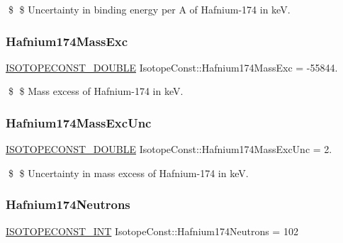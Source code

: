 \$ \$ Uncertainty in binding energy per A of Hafnium-\/174 in keV. \mbox{\label{group___isotope_const-_hafnium-_hf174_ga39241f3f01120e096b8ec5ea9c74ca69}} 
\subsubsection{\texorpdfstring{Hafnium174\+Mass\+Exc}{Hafnium174MassExc}}
{\footnotesize\ttfamily \mbox{\hyperlink{group___isotope_const-_macros_ga8f45a7272ce02c0b4c65c44636ed719a}{I\+S\+O\+T\+O\+P\+E\+C\+O\+N\+S\+T\+\_\+\+D\+O\+U\+B\+LE}} Isotope\+Const\+::\+Hafnium174\+Mass\+Exc = -\/55844.}

\$ \$ Mass excess of Hafnium-\/174 in keV. \mbox{\label{group___isotope_const-_hafnium-_hf174_gaaf8a732ea00ad16e5338df367f07bf1b}} 
\subsubsection{\texorpdfstring{Hafnium174\+Mass\+Exc\+Unc}{Hafnium174MassExcUnc}}
{\footnotesize\ttfamily \mbox{\hyperlink{group___isotope_const-_macros_ga8f45a7272ce02c0b4c65c44636ed719a}{I\+S\+O\+T\+O\+P\+E\+C\+O\+N\+S\+T\+\_\+\+D\+O\+U\+B\+LE}} Isotope\+Const\+::\+Hafnium174\+Mass\+Exc\+Unc = 2.}

\$ \$ Uncertainty in mass excess of Hafnium-\/174 in keV. \mbox{\label{group___isotope_const-_hafnium-_hf174_gaf00ef3cbf82d8cfc018cbeca94a2fbb2}} 
\subsubsection{\texorpdfstring{Hafnium174\+Neutrons}{Hafnium174Neutrons}}
{\footnotesize\ttfamily \mbox{\hyperlink{group___isotope_const-_macros_ga5f18360b3e99483a35c32d789e62621c}{I\+S\+O\+T\+O\+P\+E\+C\+O\+N\+S\+T\+\_\+\+I\+NT}} Isotope\+Const\+::\+Hafnium174\+Neutrons = 102}

